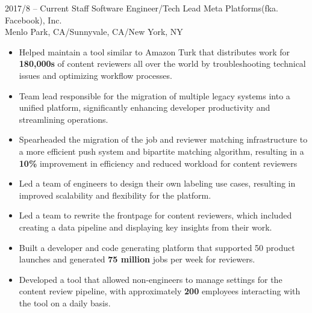 \documentclass[9pt]{developercv} %
\begin{document}
\vspace{0.5cm}






\begin{entrylist}
	\entry
		{2017/8 -- Current}
		{Staff Software Engineer/Tech Lead}
		{Meta Platforms(fka. Facebook), Inc.\\\footnotesize{Menlo Park, CA/Sunnyvale, CA/New York, NY}} 
		{
			\begin{itemize}[leftmargin=-0.0125in]
				\item Helped maintain a tool similar to Amazon Turk that distributes work for \textbf{180,000s} of content reviewers all over the world by troubleshooting technical issues and optimizing workflow processes.
				\item Team lead responsible for the migration of multiple legacy systems into a unified platform, significantly enhancing developer productivity and streamlining operations.
				\item Spearheaded the migration of the job and reviewer matching infrastructure to a more efficient push system and bipartite matching algorithm, resulting in a \textbf{10\%} improvement in efficiency and reduced workload for content reviewers
				\item Led a team of engineers to design their own labeling use cases, resulting in improved scalability and flexibility for the platform.
				\item Led a team to rewrite the frontpage for content reviewers, which included creating a data pipeline and displaying key insights from their work.
				\item Built a developer and code generating platform that supported 50 product launches and generated \textbf{75 million} jobs per week for reviewers. 
				\item Developed a tool that allowed non-engineers to manage settings for the content review pipeline, with approximately \textbf{200} employees interacting with the tool on a daily basis.

\end{itemize}}
\end{entrylist}
\end{document}
